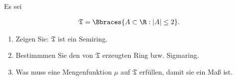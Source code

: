 
\begin{exercise}

Es sei

\begin{align*}
  \mathfrak{T} = \Bbraces{A \subset \R: |A| \leq 2}.
\end{align*}

\begin{enumerate}[label = (\alph*)]

  \item
  Zeigen Sie: $\mathfrak{T}$ ist ein Semiring.
  
  \item
  Bestimmmen Sie den von $\mathfrak{T}$ erzeugten Ring bzw. Sigmaring.
  
  \item
  Was muss eine Mengenfunktion $\mu$ auf $\mathfrak{T}$ erfüllen, damit sie ein Maß ist.

\end{enumerate}

\end{exercise}


